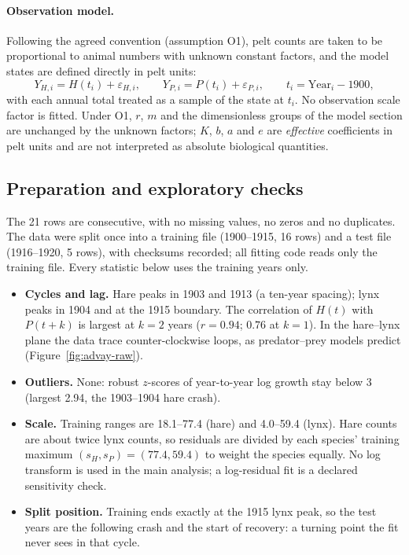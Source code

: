 \paragraph{Observation model.} Following the agreed convention (assumption O1), pelt counts
are taken to be proportional to animal numbers with unknown constant factors, and the model
states are defined directly in pelt units:
\[
Y_{H,i}=H(t_i)+\varepsilon_{H,i},\qquad Y_{P,i}=P(t_i)+\varepsilon_{P,i},\qquad t_i=\mathrm{Year}_i-1900,
\]
with each annual total treated as a sample of the state at $t_i$. No observation scale factor
is fitted. Under O1, $r$, $m$ and the dimensionless groups of the model section are unchanged
by the unknown factors; $K$, $b$, $a$ and $e$ are \emph{effective} coefficients in pelt
units and are not interpreted as absolute biological quantities.

\subsection{Preparation and exploratory checks}\label{sec:advay-checks}

The 21 rows are consecutive, with no missing values, no zeros and no duplicates. The data
were split once into a training file (1900--1915, 16 rows) and a test file (1916--1920,
5 rows), with checksums recorded; all fitting code reads only the training file. Every
statistic below uses the training years only.

\begin{itemize}
\item \textbf{Cycles and lag.} Hare peaks in 1903 and 1913 (a ten-year spacing); lynx peaks
in 1904 and at the 1915 boundary. The correlation of $H(t)$ with $P(t+k)$ is largest at
$k=2$ years ($r=0.94$; $0.76$ at $k=1$). In the hare--lynx plane the data trace
counter-clockwise loops, as predator--prey models predict (Figure~\ref{fig:advay-raw}).
\item \textbf{Outliers.} None: robust $z$-scores of year-to-year log growth stay below 3
(largest 2.94, the 1903--1904 hare crash).
\item \textbf{Scale.} Training ranges are 18.1--77.4 (hare) and 4.0--59.4 (lynx). Hare counts
are about twice lynx counts, so residuals are divided by each species' training maximum
$(s_H,s_P)=(77.4,59.4)$ to weight the species equally. No log transform is used in the main
analysis; a log-residual fit is a declared sensitivity check.
\item \textbf{Split position.} Training ends exactly at the 1915 lynx peak, so the test years
are the following crash and the start of recovery: a turning point the fit never sees in
that cycle.
\end{itemize}

